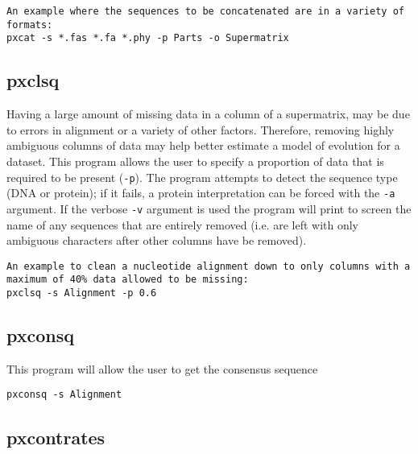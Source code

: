 \documentclass[12pt,letterpaper]{memoir}
\begin{document}
\begin{flushleft}
\begin{verbatim}
An example where the sequences to be concatenated are in a variety of formats:
pxcat -s *.fas *.fa *.phy -p Parts -o Supermatrix
\end{verbatim}
\end{flushleft}

\subsection{pxclsq}

Having a large amount of missing data in a column of a supermatrix, may be due to errors in alignment or a variety of other factors. Therefore, removing highly ambiguous columns of data may help better estimate a model of evolution for a dataset. This program allows the user to specify a proportion of data that is required to be present (\texttt{-p}). The program attempts to detect the sequence type (DNA or protein); if it fails,  a protein interpretation can be forced with the \texttt{-a} argument. If the verbose \texttt{-v} argument is used the program will print to screen the name of any sequences that are entirely removed (i.e. are left with only ambiguous characters after other columns have be removed).

\begin{flushleft}
\begin{verbatim}
An example to clean a nucleotide alignment down to only columns with a
maximum of 40% data allowed to be missing:
pxclsq -s Alignment -p 0.6
\end{verbatim}
\end{flushleft}

\subsection{pxconsq}

This program will allow the user to get the consensus sequence 

\begin{flushleft}
\begin{verbatim}
pxconsq -s Alignment
\end{verbatim}
\end{flushleft}

\subsection{pxcontrates}
\end{document}
